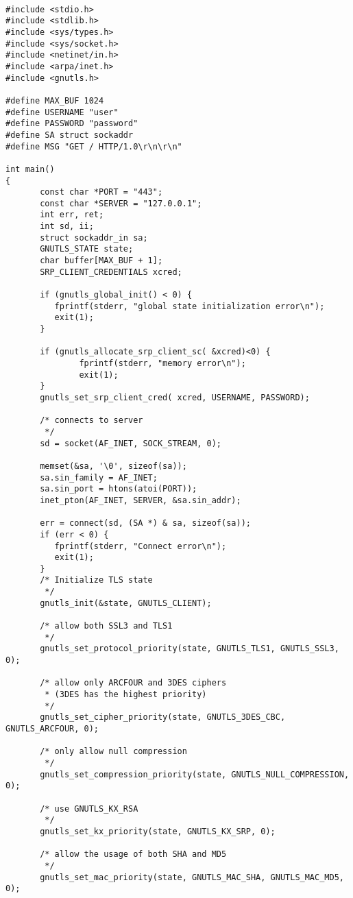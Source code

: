 \begin{verbatim}

#include <stdio.h>
#include <stdlib.h>
#include <sys/types.h>
#include <sys/socket.h>
#include <netinet/in.h>
#include <arpa/inet.h>
#include <gnutls.h>

#define MAX_BUF 1024
#define USERNAME "user"
#define PASSWORD "password"
#define SA struct sockaddr
#define MSG "GET / HTTP/1.0\r\n\r\n"

int main()
{
       const char *PORT = "443";
       const char *SERVER = "127.0.0.1";
       int err, ret;
       int sd, ii;
       struct sockaddr_in sa;
       GNUTLS_STATE state;
       char buffer[MAX_BUF + 1];
       SRP_CLIENT_CREDENTIALS xcred;

       if (gnutls_global_init() < 0) {
	      fprintf(stderr, "global state initialization error\n");
	      exit(1);
       }

       if (gnutls_allocate_srp_client_sc( &xcred)<0) {
               fprintf(stderr, "memory error\n");
               exit(1);
       }
       gnutls_set_srp_client_cred( xcred, USERNAME, PASSWORD);

       /* connects to server 
        */
       sd = socket(AF_INET, SOCK_STREAM, 0);

       memset(&sa, '\0', sizeof(sa));
       sa.sin_family = AF_INET;
       sa.sin_port = htons(atoi(PORT));
       inet_pton(AF_INET, SERVER, &sa.sin_addr);

       err = connect(sd, (SA *) & sa, sizeof(sa));
       if (err < 0) {
	      fprintf(stderr, "Connect error\n");
	      exit(1);
       }
       /* Initialize TLS state 
        */
       gnutls_init(&state, GNUTLS_CLIENT);

       /* allow both SSL3 and TLS1
        */
       gnutls_set_protocol_priority(state, GNUTLS_TLS1, GNUTLS_SSL3, 0);

       /* allow only ARCFOUR and 3DES ciphers
        * (3DES has the highest priority)
        */
       gnutls_set_cipher_priority(state, GNUTLS_3DES_CBC, GNUTLS_ARCFOUR, 0);

       /* only allow null compression
        */
       gnutls_set_compression_priority(state, GNUTLS_NULL_COMPRESSION, 0);

       /* use GNUTLS_KX_RSA
        */
       gnutls_set_kx_priority(state, GNUTLS_KX_SRP, 0);

       /* allow the usage of both SHA and MD5
        */
       gnutls_set_mac_priority(state, GNUTLS_MAC_SHA, GNUTLS_MAC_MD5, 0);



\end{verbatim}
